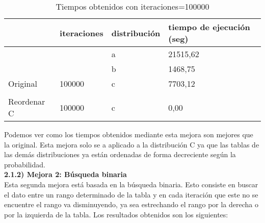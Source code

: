 \documentclass{article}
\begin{document}
	\begin{table}[h]
		\begin{tabular}{llll}
			\hline
			\rowcolor[HTML]{F8A102} 
			\multicolumn{1}{|l|}{\cellcolor[HTML]{F8A102}modificación} & \multicolumn{1}{l|}{\cellcolor[HTML]{F8A102}iteraciones} & \multicolumn{1}{l|}{\cellcolor[HTML]{F8A102}distribución} & \multicolumn{1}{l|}{\cellcolor[HTML]{F8A102}tiempo de ejecución (seg)} \\ \hline
			\multicolumn{1}{|l|}{}                                     & \multicolumn{1}{l|}{}                                    & \multicolumn{1}{l|}{a}                                    & \multicolumn{1}{l|}{21515,62}                                    \\ \cline{3-4} 
			\multicolumn{1}{|l|}{}                                     & \multicolumn{1}{l|}{}                                    & \multicolumn{1}{l|}{b}                                    & \multicolumn{1}{l|}{1468,75}                                     \\ \cline{3-4} 
			\multicolumn{1}{|l|}{\multirow{-3}{*}{Original}}           & \multicolumn{1}{l|}{\multirow{-3}{*}{100000}}            & \multicolumn{1}{l|}{c}                                    & \multicolumn{1}{l|}{7703,12}                                     \\ \hline
			&                                                          &                                                           &                                                                  \\ \hline
			\multicolumn{1}{|l|}{Reordenar C}                          & \multicolumn{1}{l|}{100000}                              & \multicolumn{1}{l|}{c}                                    & \multicolumn{1}{l|}{0,00}                                        \\ \hline
		\end{tabular}
		\caption{Tiempos obtenidos con iteraciones=100000}
	\end{table}

	Podemos ver como los tiempos obtenidos mediante esta mejora son mejores que la original. Esta mejora solo se a aplicado a la distribución C ya que las tablas de las demás distribuciones ya están ordenadas de forma decreciente según la probabilidad. \\
	
	\normalsize{\textbf{2.1.2) Mejora 2: Búsqueda binaria}} \\
	
	Esta segunda mejora está basada en la búsqueda binaria. Esto consiste en buscar el dato entre un rango determinado de la tabla y en cada iteración que este no se encuentre el rango va disminuyendo, ya sea estrechando el rango por la derecha o por la izquierda de la tabla. Los resultados obtenidos son los siguientes: \\ 
	
\end{document}
